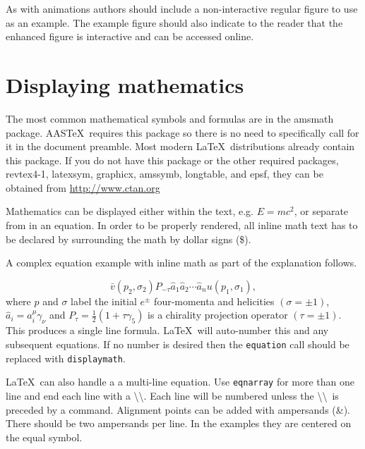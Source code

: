 \documentclass{aastex6}
\newcommand\aastex{AAS\TeX}
\newcommand\latex{La\TeX}
\begin{document}
As with animations authors should include a non-interactive regular figure
to use as an example.  The example figure should also indicate to the reader
that the enhanced figure is interactive and can be accessed online.

\section{Displaying mathematics} \label{sec:displaymath}

The most common mathematical symbols and formulas are in the amsmath
package.  \aastex\ requires this package so there is no need to
specifically call for it in the document preamble.  Most modern \latex\
distributions already contain this package.  If you do not have this
package or the other required packages, revtex4-1, latexsym, graphicx,
amssymb, longtable, and epsf, they can be obtained from
\url{http://www.ctan.org}

Mathematics can be displayed either within the text, e.g. $E = mc^2$, or
separate from in an equation.  In order to be properly rendered, all inline
math text has to be declared by surrounding the math by dollar signs (\$).

A complex equation example with inline math as part of the explanation
follows.

\begin{equation}
\bar v(p_2,\sigma_2)P_{-\tau}\hat a_1\hat a_2\cdots
\hat a_nu(p_1,\sigma_1) ,
\end{equation}
where $p$ and $\sigma$ label the initial $e^{\pm}$ four-momenta
and helicities $(\sigma = \pm 1)$, $\hat a_i=a^\mu_i\gamma_\nu$
and $P_\tau=\frac{1}{2}(1+\tau\gamma_5)$ is a chirality projection
operator $(\tau = \pm1)$.  This produces a single line formula.  \latex\ will
auto-number this and any subsequent equations.  If no number is desired then
the {\tt\string equation} call should be replaced with {\tt\string displaymath}.

\latex\ can also handle a a multi-line equation.  Use {\tt\string eqnarray}
for more than one line and end each line with a
\textbackslash\textbackslash.  Each line will be numbered unless the
\textbackslash\textbackslash\ is preceded by a {\tt\string\nonumber}
command.  Alignment points can be added with ampersands (\&).  There should be
two ampersands per line. In the examples they are centered on the equal
symbol.
\end{document}
